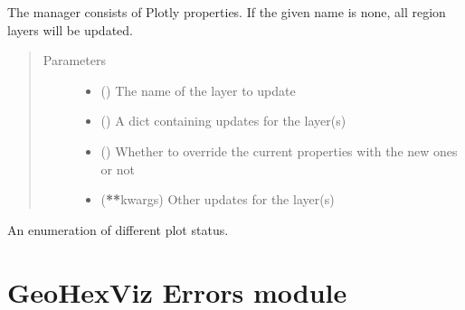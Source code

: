 \documentclass[letterpaper,10pt,english]{sphinxmanual}
\begin{document}
\begin{fulllineitems}
\begin{fulllineitems}
\sphinxAtStartPar
The manager consists of Plotly properties.
If the given name is none, all region layers will be updated.
\begin{quote}\begin{description}
\item[{Parameters}] \leavevmode\begin{itemize}
\item {} 
\sphinxAtStartPar
{} () \textendash{} The name of the layer to update

\item {} 
\sphinxAtStartPar
{} () \textendash{} A dict containing updates for the layer(s)

\item {} 
\sphinxAtStartPar
{} () \textendash{} Whether to override the current properties with the new ones or not

\item {} 
\sphinxAtStartPar
{} ({\color{red}\bfseries{}**}kwargs) \textendash{} Other updates for the layer(s)

\end{itemize}

\end{description}\end{quote}

\end{fulllineitems}


\end{fulllineitems}


\begin{fulllineitems}
\label{\detokenize{builder:geohexviz.builder.PlotStatus}}
\sphinxAtStartPar
An enumeration of different plot status.

\end{fulllineitems}



\chapter{GeoHexViz \sphinxhyphen{} Errors module}
\label{\detokenize{errors:module-geohexviz.errors}}\label{\detokenize{errors:geohexviz-errors-module}}\label{\detokenize{errors::doc}}
\end{document}
